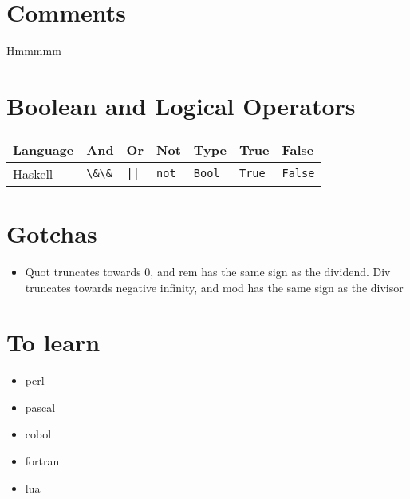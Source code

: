 \documentclass{article}
\begin{document}
\section{Comments}
Hmmmmm

\section{Boolean and Logical Operators}
\begin{longtabu} to 0.75\linewidth{ X X X  X X X X }
	Language & And & Or & Not & Type & True & False \\
	\hline
	Haskell & \lstinline$\&\&$ & \lstinline$||$ & \lstinline$not$ & \lstinline$Bool$ & \lstinline$True$ & \lstinline$False$ \\
\end{longtabu}

\section{Gotchas}
\begin{itemize}
	\item Quot truncates towards 0, and rem has the same sign as the dividend. Div truncates towards negative infinity, and mod has the same sign as the divisor
\end{itemize}

\section{To learn}
\begin{itemize}
	\item perl
	\item pascal
	\item cobol
	\item fortran
	\item lua
\end{itemize}
\end{document}

